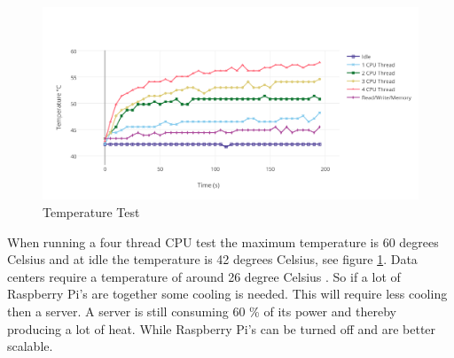 \documentclass{sig-alternate-br}
\begin{document}
\begin{figure}[H]
	\includegraphics[scale=0.37]{Temperature_Test.png}
	\caption{Temperature Test}
	\label{fig:temp}
	
\end{figure}
When running a four thread CPU test the maximum temperature is 60 degrees Celsius and at idle the temperature is 42 degrees Celsius, see figure \ref{fig:temp}. Data centers require a temperature of around 26 degree Celsius \cite{temperature}. So if a lot of Raspberry Pi's are together some cooling is needed. This will require less cooling then a server. A server is still consuming 60 \% of its power and thereby producing a lot of heat. While Raspberry Pi's can be turned off and are better scalable. 
\end{document}
